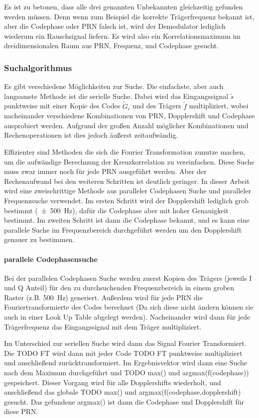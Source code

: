 Es ist zu betonen, dass alle drei genannten Unbekannten gleichzeitig gefunden werden müssen. Denn wenn zum Beispiel die korrekte Trägerfrequenz bekannt ist, aber die Codephase oder PRN falsch ist, wird der Demodulator lediglich wiederum ein Rauschsignal liefern. Es wird also ein Korrelationsmaximum im dreidimensionalen Raum aus PRN, Frequenz, und Codephase gesucht.

\subsubsection{Suchalgorithmus}
Es gibt verschiedene Möglichkeiten zur Suche. Die einfachste, aber auch langsamste Methode ist die serielle Suche. Dabei wird das Eingangssignal $\tilde{s}$ punktweise mit einer Kopie des Codes $\tilde{G}_i$ und des Trägers $\tilde{f}$ multipliziert, wobei nacheinander verschiedene Kombinationen von \gls{PRN}, Dopplershift und Codephase ausprobiert werden. Aufgrund der großen Anzahl möglicher Kombinationen und Rechenoperationen ist dies jedoch äußerst zeitaufwändig.

Effizienter sind Methoden die sich die Fourier Transformation zunutze machen, um die aufwändige Berechnung der Kreuzkorrelation zu vereinfachen. Diese Suche muss zwar immer noch für jede PRN ausgeführt werden. Aber der Rechenaufwand bei den weiteren Schritten ist deutlich geringer. 
In dieser Arbeit wird eine zweischrittige Methode aus paralleler Codephasen Suche und paralleler Frequenzsuche verwendet. Im ersten Schritt wird der Dopplershift lediglich grob bestimmt (\SI{\pm500}{\Hz}), dafür die Codephase aber mit hoher Genauigkeit bestimmt. Im zweiten Schritt ist dann die Codephase bekannt, und es kann eine parallele Suche im Frequenzbereich durchgeführt werden um den Dopplershift genauer zu bestimmen.

\paragraph{parallele Codephasensuche}
Bei der parallelen Codephasen Suche werden zuerst Kopien des Trägers  (jeweils I und Q Anteil) für den zu durchsuchenden Frequenzbereich in einem groben Raster (z.B. \SI{500}{\Hz}) generiert. Außerdem wird für jede PRN die Fouriertransformierte des Codes  berechnet (Da sich diese nicht ändern können sie auch in einer Look Up Table abgelegt werden). Nacheinander wird dann für jede Trägerfrequenz das Eingangssignal mit dem Träger multipliziert. 

Im Unterschied zur seriellen Suche wird dann das Signal  Fourier Transformiert. Die TODO FT wird dann mit jeder Code TODO FT punktweise multipliziert und anschließend zurücktransformiert. Im Ergebnisvektor wird dann eine Suche nach dem Maximum durchgeführt und TODO max() und argmax(f(codephase)) gespeichert. Dieser Vorgang wird für alle Dopplershifts wiederholt, und anschließend das globale TODO max() und argmax(f(codephase,dopplershift) gesucht. Das gefundene argmax() ist dann die Codephase und Dopplershift für diese PRN.

